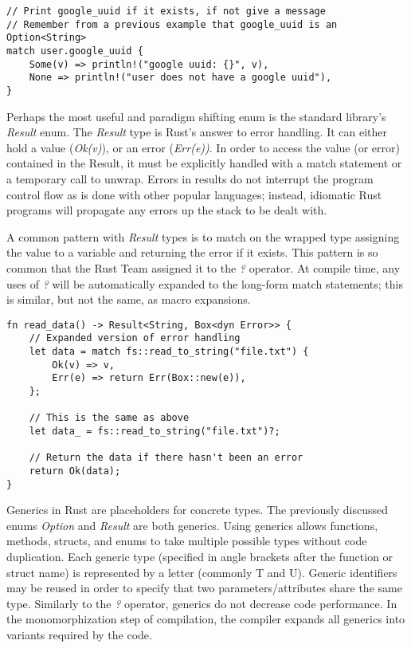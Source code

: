 \documentclass[12pt]{article}
\begin{document}
\singlespacing{}
\begin{verbatim}
// Print google_uuid if it exists, if not give a message
// Remember from a previous example that google_uuid is an Option<String>
match user.google_uuid {
    Some(v) => println!("google uuid: {}", v),
    None => println!("user does not have a google uuid"),
}
\end{verbatim}
\doublespacing{}

Perhaps the most useful and paradigm shifting enum is the standard library's
\textit{Result} enum. The \textit{Result} type is Rust's answer to error
handling. It can either hold a value (\textit{Ok(v)}), or an error
(\textit{Err(e))}. In order to access the value (or error) contained in the
Result, it must be explicitly handled with a match statement or a temporary call
to unwrap. Errors in results do not interrupt the program control flow as is
done with other popular languages; instead, idiomatic Rust programs will propagate
any errors up the stack to be dealt with.

A common pattern with \textit{Result} types is to match on the wrapped type
assigning the value to a variable and returning the error if it exists. This
pattern is so common that the Rust Team assigned it to the \textit{?} operator.
At compile time, any uses of \textit{?} will be automatically expanded to the
long-form match statements; this is similar, but not the same, as macro
expansions.

\singlespacing{}
\begin{verbatim}
fn read_data() -> Result<String, Box<dyn Error>> {
    // Expanded version of error handling
    let data = match fs::read_to_string("file.txt") {
        Ok(v) => v,
        Err(e) => return Err(Box::new(e)),
    };

    // This is the same as above
    let data_ = fs::read_to_string("file.txt")?;

    // Return the data if there hasn't been an error
    return Ok(data);
}
\end{verbatim}
\doublespacing{}

Generics in Rust are placeholders for concrete types. The previously discussed
enums \textit{Option} and \textit{Result} are both generics. Using generics
allows functions, methods, structs, and enums to take multiple possible types
without code duplication. Each generic type (specified in angle brackets after
the function or struct name) is represented by a letter (commonly T and U).
Generic identifiers may be reused in order to specify that two
parameters/attributes share the same type. Similarly to the \textit{?}
operator, generics do not decrease code performance. In the monomorphization
step of compilation, the compiler expands all generics into variants required
by the code.
\end{document}
